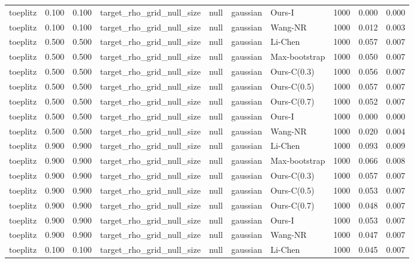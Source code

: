 \begin{tabular}{lrrllllrrr}
toeplitz & 0.100 & 0.100 & target\_rho\_grid\_null\_size & null & gaussian & Ours-I & 1000 & 0.000 & 0.000 \\
toeplitz & 0.100 & 0.100 & target\_rho\_grid\_null\_size & null & gaussian & Wang-NR & 1000 & 0.012 & 0.003 \\
toeplitz & 0.500 & 0.500 & target\_rho\_grid\_null\_size & null & gaussian & Li-Chen & 1000 & 0.057 & 0.007 \\
toeplitz & 0.500 & 0.500 & target\_rho\_grid\_null\_size & null & gaussian & Max-bootstrap & 1000 & 0.050 & 0.007 \\
toeplitz & 0.500 & 0.500 & target\_rho\_grid\_null\_size & null & gaussian & Ours-C(0.3) & 1000 & 0.056 & 0.007 \\
toeplitz & 0.500 & 0.500 & target\_rho\_grid\_null\_size & null & gaussian & Ours-C(0.5) & 1000 & 0.057 & 0.007 \\
toeplitz & 0.500 & 0.500 & target\_rho\_grid\_null\_size & null & gaussian & Ours-C(0.7) & 1000 & 0.052 & 0.007 \\
toeplitz & 0.500 & 0.500 & target\_rho\_grid\_null\_size & null & gaussian & Ours-I & 1000 & 0.000 & 0.000 \\
toeplitz & 0.500 & 0.500 & target\_rho\_grid\_null\_size & null & gaussian & Wang-NR & 1000 & 0.020 & 0.004 \\
toeplitz & 0.900 & 0.900 & target\_rho\_grid\_null\_size & null & gaussian & Li-Chen & 1000 & 0.093 & 0.009 \\
toeplitz & 0.900 & 0.900 & target\_rho\_grid\_null\_size & null & gaussian & Max-bootstrap & 1000 & 0.066 & 0.008 \\
toeplitz & 0.900 & 0.900 & target\_rho\_grid\_null\_size & null & gaussian & Ours-C(0.3) & 1000 & 0.057 & 0.007 \\
toeplitz & 0.900 & 0.900 & target\_rho\_grid\_null\_size & null & gaussian & Ours-C(0.5) & 1000 & 0.053 & 0.007 \\
toeplitz & 0.900 & 0.900 & target\_rho\_grid\_null\_size & null & gaussian & Ours-C(0.7) & 1000 & 0.048 & 0.007 \\
toeplitz & 0.900 & 0.900 & target\_rho\_grid\_null\_size & null & gaussian & Ours-I & 1000 & 0.053 & 0.007 \\
toeplitz & 0.900 & 0.900 & target\_rho\_grid\_null\_size & null & gaussian & Wang-NR & 1000 & 0.047 & 0.007 \\
toeplitz & 0.100 & 0.100 & target\_rho\_grid\_null\_size & null & gaussian & Li-Chen & 1000 & 0.045 & 0.007 \\

\end{tabular}
